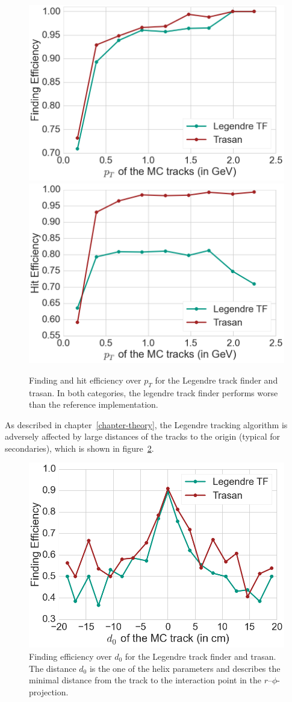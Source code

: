 \begin{figure}
  \centering
  \includegraphics[width=0.48\linewidth]{figures/workflow/legendre_pt.png}
  \includegraphics[width=0.48\linewidth]{figures/workflow/legendre_hit.png}
  \caption{Finding and hit efficiency over $p_T$ for the Legendre track finder and trasan. In both categories, the legendre track finder performs worse than the reference implementation.}
  \label{fig-legendre-finding-efficiency}
\end{figure}

As described in chapter~\ref{chapter-theory}, the Legendre tracking algorithm is adversely affected by large distances of the tracks to the origin (typical for secondaries), which is shown in figure~\ref{fig-legendre-d0}.

\begin{figure}
  \centering
  \includegraphics[width=0.7\linewidth]{figures/workflow/legendre_d0.png}
  \caption{Finding efficiency over $d_0$ for the Legendre track finder and trasan. The distance $d_0$ is the one of the helix parameters and describes the minimal distance from the track to the interaction point in the $r$--$\phi$-projection.}
  \label{fig-legendre-d0}
\end{figure}

